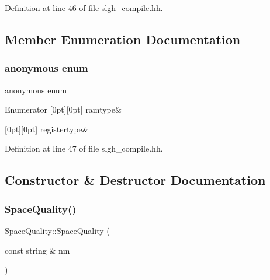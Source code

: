 Definition at line 46 of file slgh\+\_\+compile.\+hh.



\subsection{Member Enumeration Documentation}
\mbox{\label{struct_space_quality_aa71ecaac88b2aa42675c8d709b3919c4}} 
\subsubsection{\texorpdfstring{anonymous enum}{anonymous enum}}
{\footnotesize\ttfamily anonymous enum}

\begin{DoxyEnumFields}{Enumerator}
[0pt][0pt]{}\mbox{\label{struct_space_quality_aa71ecaac88b2aa42675c8d709b3919c4a8a2713d7c09dc831cb443d814abc03c5}} 
ramtype&\\
\hline

[0pt][0pt]{}\mbox{\label{struct_space_quality_aa71ecaac88b2aa42675c8d709b3919c4a743b3aa3a949eff694df8417dac50ed5}} 
registertype&\\
\hline

\end{DoxyEnumFields}


Definition at line 47 of file slgh\+\_\+compile.\+hh.



\subsection{Constructor \& Destructor Documentation}
\mbox{\label{struct_space_quality_ac5c528c46fa5a6d6c3d910ca6b792651}} 
\subsubsection{\texorpdfstring{SpaceQuality()}{SpaceQuality()}}
{\footnotesize\ttfamily Space\+Quality\+::\+Space\+Quality (\begin{DoxyParamCaption}\item[{const string \&}]{nm }\end{DoxyParamCaption})}



